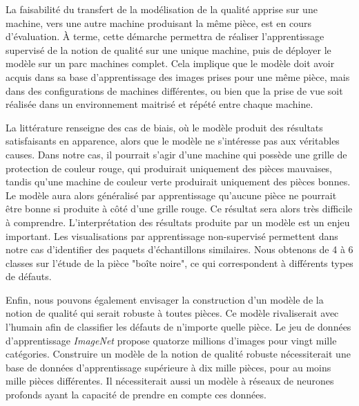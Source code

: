 La faisabilité du transfert de la modélisation de la qualité apprise sur une machine, vers une autre machine produisant la même pièce, est en cours d’évaluation.
À terme, cette démarche permettra de réaliser l’apprentissage supervisé de la notion de qualité sur une unique machine, puis de déployer le modèle sur un parc machines complet.
Cela implique que le modèle doit avoir acquis dans sa base d’apprentissage des images prises pour une même pièce, mais dans des configurations de machines différentes, ou bien que la prise de vue soit réalisée dans un environnement maitrisé et répété entre chaque machine.

La littérature renseigne des cas de biais, où le modèle produit des résultats satisfaisants en apparence, alors que le modèle ne s’intéresse pas aux véritables causes.
Dans notre cas, il pourrait s'agir d'une machine qui possède une grille de protection de couleur rouge, qui produirait uniquement des pièces mauvaises, tandis qu’une machine de couleur verte produirait uniquement des pièces bonnes.
Le modèle aura alors généralisé par apprentissage qu’aucune pièce ne pourrait être bonne si produite à côté d’une grille rouge.
Ce résultat sera alors très difficile à comprendre.
L'interprétation des résultats produite par un modèle est un enjeu important.
Les visualisations par apprentissage non-supervisé permettent dans notre cas d'identifier des paquets d'échantillons similaires.
Nous obtenons de 4 à 6 classes sur l'étude de la pièce "boîte noire", ce qui correspondent à différents types de défauts.

Enfin, nous pouvons également envisager la construction d’un modèle de la notion de qualité qui serait robuste à toutes pièces.
Ce modèle rivaliserait avec l’humain afin de classifier les défauts de n’importe quelle pièce.
Le jeu de données d'apprentissage \textit{ImageNet} propose quatorze millions d’images pour vingt mille catégories.
Construire un modèle de la notion de qualité robuste nécessiterait une base de données d’apprentissage supérieure à dix mille pièces, pour au moins mille pièces différentes.
Il nécessiterait aussi un modèle à réseaux de neurones profonds ayant la capacité de prendre en compte ces données.

